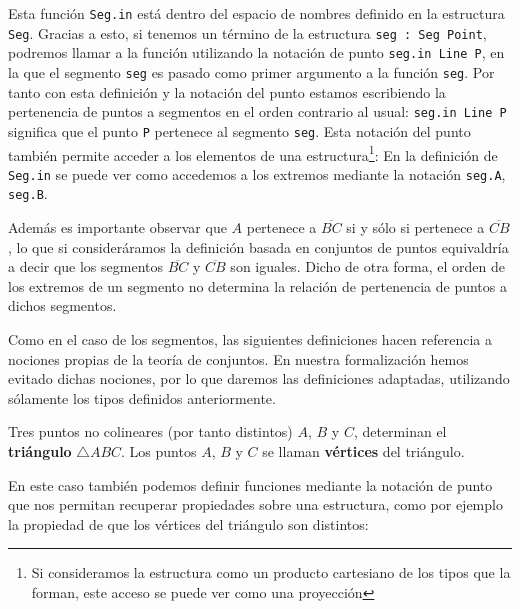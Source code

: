 Esta función \lstinline{Seg.in} está dentro del espacio de nombres definido en
la estructura \lstinline{Seg}. Gracias a esto, si tenemos un término de la
estructura \lstinline{seg : Seg Point}, podremos llamar a la función utilizando
la notación de punto \lstinline{seg.in Line P}, en la que el segmento
\lstinline{seg} es pasado como primer argumento a la función \lstinline{seg}.
Por tanto con esta definición y la notación del punto estamos escribiendo la
pertenencia de puntos a segmentos en el orden contrario al usual:
\lstinline{seg.in Line P} significa que el punto \lstinline{P} pertenece al
segmento \lstinline{seg}. Esta notación del punto también permite acceder a los
elementos de una estructura\footnote{Si consideramos la estructura como un producto
	cartesiano de los tipos que la forman, este acceso se puede ver como una
	proyección}: En la definición de \lstinline{Seg.in} se puede ver como accedemos
a los extremos mediante la notación \lstinline{seg.A}, \lstinline{seg.B}.

Además es importante observar que $A$ pertenece a $\overline{BC}$ si y sólo si
pertenece a $\overline{CB}$, lo que si consideráramos la definición basada en
conjuntos de puntos equivaldría a decir que los segmentos $\overline{BC}$ y
$\overline{CB}$ son iguales. Dicho de otra forma, el orden de los extremos de un
segmento no determina la relación de pertenencia de puntos a dichos segmentos.


Como en el caso de los segmentos, las siguientes definiciones hacen referencia a
nociones propias de la teoría de conjuntos. En nuestra formalización hemos
evitado dichas nociones, por lo que daremos las definiciones adaptadas,
utilizando sólamente los tipos definidos anteriormente.

\begin{defin*}[Triángulos]
	Tres puntos no colineares (por tanto distintos) $A$, $B$ y $C$, determinan
	el \textbf{triángulo} $\triangle ABC$. Los puntos $A$, $B$ y $C$ se llaman
	\textbf{vértices} del triángulo.
\end{defin*}


En este caso también podemos definir funciones mediante la notación de punto que
nos permitan recuperar propiedades sobre una estructura, como por ejemplo la
propiedad de que los vértices del triángulo son distintos:


